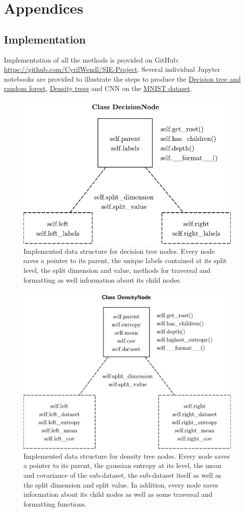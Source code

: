 \documentclass{article}
\begin{document}
\newpage
\printbibliography



\newpage
\renewcommand{\thesubsection}{\Alph{subsection}}
\pagebreak  

\section{Appendices}
\subsection{Implementation}
\label{subsec:implementation}
Implementation of all the methods is provided on GitHub: \url{https://github.com/CyrilWendl/SIE-Project}. Several individual Jupyter notebooks are provided to illustrate the steps to produce the \href{https://github.com/CyrilWendl/SIE-Project/blob/master/Code/decision_tree.ipynb}{Decision tree and random forest}, \href{https://github.com/CyrilWendl/SIE-Project/blob/master/Code/density_tree.ipynb}{Density trees} and CNN on the \href{https://github.com/CyrilWendl/SIE-Project/blob/master/Code/MNIST.ipynb}{MNIST dataset}.

\begin{figure}[H]
    \centering
    \includegraphics[width=.4\textwidth]{decision-node.pdf}
    \caption{Implemented data structure for decision tree nodes. Every node saves a pointer to its parent, the unique labels contained at its split level, the split dimension and value, methods for traversal and formatting as well information about its child nodes.}
    \label{fig:decision-node}
\end{figure}

\begin{figure}[H]
    \centering
    \includegraphics[width=.5\textwidth]{density-node.pdf}
    \caption{Implemented data structure for density tree nodes. Every node saves a pointer to its parent, the gaussian entropy at its level, the mean and covariance of the sub-dataset, the sub-dataset itself as well as the split dimension and split value. In addition, every node saves information about its child nodes as well as some traversal and formatting functions.}
    \label{fig:density-node}
\end{figure}
\end{document}
